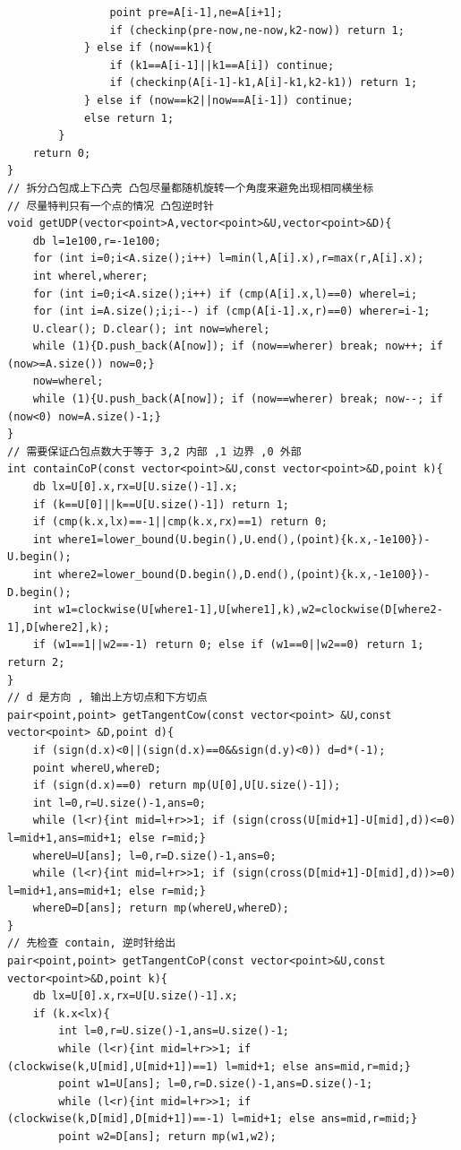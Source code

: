 \documentclass[twoside]{article}
\begin{document}
\begin{lstlisting}
				point pre=A[i-1],ne=A[i+1];
				if (checkinp(pre-now,ne-now,k2-now)) return 1;
			} else if (now==k1){
				if (k1==A[i-1]||k1==A[i]) continue;
				if (checkinp(A[i-1]-k1,A[i]-k1,k2-k1)) return 1;
			} else if (now==k2||now==A[i-1]) continue;
			else return 1;
		}
	return 0;
}
// 拆分凸包成上下凸壳 凸包尽量都随机旋转一个角度来避免出现相同横坐标 
// 尽量特判只有一个点的情况 凸包逆时针
void getUDP(vector<point>A,vector<point>&U,vector<point>&D){
    db l=1e100,r=-1e100;
    for (int i=0;i<A.size();i++) l=min(l,A[i].x),r=max(r,A[i].x);
    int wherel,wherer;
    for (int i=0;i<A.size();i++) if (cmp(A[i].x,l)==0) wherel=i;
    for (int i=A.size();i;i--) if (cmp(A[i-1].x,r)==0) wherer=i-1;
    U.clear(); D.clear(); int now=wherel;
    while (1){D.push_back(A[now]); if (now==wherer) break; now++; if (now>=A.size()) now=0;}
    now=wherel;
    while (1){U.push_back(A[now]); if (now==wherer) break; now--; if (now<0) now=A.size()-1;}
}
// 需要保证凸包点数大于等于 3,2 内部 ,1 边界 ,0 外部
int containCoP(const vector<point>&U,const vector<point>&D,point k){
    db lx=U[0].x,rx=U[U.size()-1].x;
    if (k==U[0]||k==U[U.size()-1]) return 1;
    if (cmp(k.x,lx)==-1||cmp(k.x,rx)==1) return 0;
    int where1=lower_bound(U.begin(),U.end(),(point){k.x,-1e100})-U.begin();
    int where2=lower_bound(D.begin(),D.end(),(point){k.x,-1e100})-D.begin();
    int w1=clockwise(U[where1-1],U[where1],k),w2=clockwise(D[where2-1],D[where2],k);
    if (w1==1||w2==-1) return 0; else if (w1==0||w2==0) return 1; return 2;
}
// d 是方向 , 输出上方切点和下方切点
pair<point,point> getTangentCow(const vector<point> &U,const vector<point> &D,point d){
    if (sign(d.x)<0||(sign(d.x)==0&&sign(d.y)<0)) d=d*(-1);
    point whereU,whereD;
    if (sign(d.x)==0) return mp(U[0],U[U.size()-1]);
    int l=0,r=U.size()-1,ans=0;
    while (l<r){int mid=l+r>>1; if (sign(cross(U[mid+1]-U[mid],d))<=0) l=mid+1,ans=mid+1; else r=mid;}
    whereU=U[ans]; l=0,r=D.size()-1,ans=0;
    while (l<r){int mid=l+r>>1; if (sign(cross(D[mid+1]-D[mid],d))>=0) l=mid+1,ans=mid+1; else r=mid;}
    whereD=D[ans]; return mp(whereU,whereD);
}
// 先检查 contain, 逆时针给出
pair<point,point> getTangentCoP(const vector<point>&U,const vector<point>&D,point k){
    db lx=U[0].x,rx=U[U.size()-1].x;
    if (k.x<lx){
        int l=0,r=U.size()-1,ans=U.size()-1;
        while (l<r){int mid=l+r>>1; if (clockwise(k,U[mid],U[mid+1])==1) l=mid+1; else ans=mid,r=mid;}
        point w1=U[ans]; l=0,r=D.size()-1,ans=D.size()-1;
        while (l<r){int mid=l+r>>1; if (clockwise(k,D[mid],D[mid+1])==-1) l=mid+1; else ans=mid,r=mid;}
        point w2=D[ans]; return mp(w1,w2);

\end{lstlisting}
\end{document}
